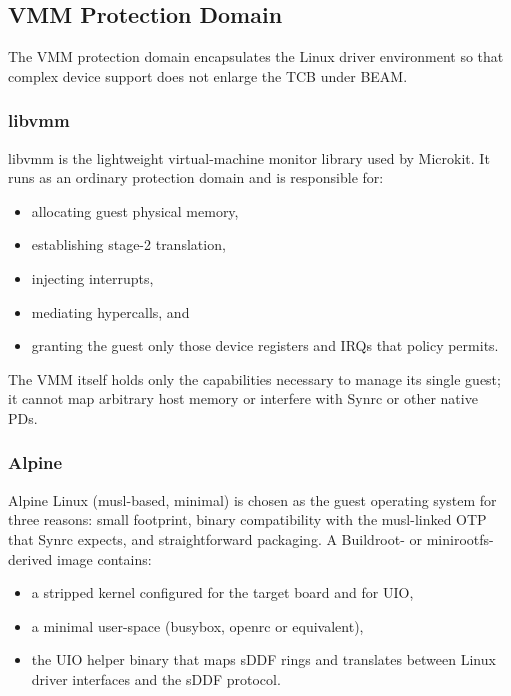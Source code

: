 \documentclass{article}
\begin{document}
\subsection{VMM Protection Domain}
\label{sec:vmm}

The VMM protection domain encapsulates the Linux driver environment so that complex device support does not enlarge the TCB under BEAM.

\subsubsection{libvmm}
\label{sec:libvmm}

libvmm is the lightweight virtual-machine monitor library used by Microkit. It runs as an ordinary protection domain and is responsible for:

\begin{itemize}
  \item allocating guest physical memory,
  \item establishing stage-2 translation,
  \item injecting interrupts,
  \item mediating hypercalls, and
  \item granting the guest only those device registers and IRQs that policy permits.
\end{itemize}

The VMM itself holds only the capabilities necessary to manage its single guest; it cannot map arbitrary host memory or interfere with Synrc or other native PDs.

\subsubsection{Alpine}
\label{sec:alpine}

Alpine Linux (musl-based, minimal) is chosen as the guest operating system for three reasons:
small footprint, binary compatibility with the musl-linked OTP that Synrc expects,
and straightforward packaging. A Buildroot- or minirootfs-derived image contains:

\begin{itemize}
  \item a stripped kernel configured for the target board and for UIO,
  \item a minimal user-space (busybox, openrc or equivalent),
  \item the UIO helper binary that maps sDDF rings and translates between Linux driver interfaces and the sDDF protocol.
\end{itemize}
\end{document}
